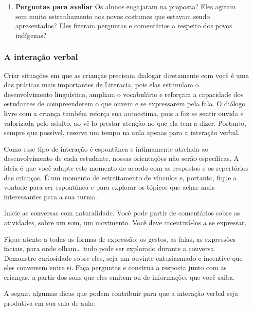 \documentclass[11pt]{extarticle}
\begin{document}
\begin{enumerate}
\item \textbf{Perguntas para avaliar} Os alunos engajaram na proposta? 
Eles agiram sem muito estranhamento aos novos costumes que estavam sendo apresentados?
Eles fizeram perguntas e comentários a respeito dos povos indígenas?
\end{enumerate}

\subsubsection{A interação verbal} 
Criar situações em que as crianças precisam dialogar diretamente com 
você é uma das práticas mais importantes de Literacia, pois elas estimulam 
o desenvolvimento linguístico, ampliam o vocabulário e reforçam a 
capacidade dos estudantes de compreenderem o que ouvem e se expressarem 
pela fala. O diálogo livre com a criança também reforça sua autoestima, pois 
a faz se sentir ouvida e valorizada pelo adulto, ao vê-lo prestar atenção 
no que ela tem a dizer. Portanto, sempre que possível, reserve um tempo na 
aula apenas para a interação verbal. 

Como esse tipo de interação é espontânea e intimamente atrelada ao 
desenvolvimento de cada estudante, nossas orientações não serão específicas. 
A ideia é que você adapte este momento de acordo com as respostas e os 
repertórios das crianças. É um momento de estreitamento de vínculos e, portanto, 
fique a vontade para ser espontânea e para explorar os tópicos que achar 
mais interessantes para a sua turma.

Inicie as conversas com naturalidade. Você pode partir de comentários
sobre as atividades, sobre um som, um movimento. Você deve incentivá-los a 
se expressar.

Fique atento a todas as formas de expressão: os gestos, as falas, as 
expressões faciais, para onde olham\ldots{} tudo pode ser explorado durante a conversa. 
Demonstre curiosidade sobre eles, seja um ouvinte entusiasmado e incentive que eles 
conversem entre si. Faça perguntas e construa a resposta junto com as crianças, 
a partir dos sons que eles emitem ou de informações que você saiba. 

A seguir, algumas dicas que podem contribuir para que a interação verbal 
seja produtiva em sua sala de aula: 
\end{document}
